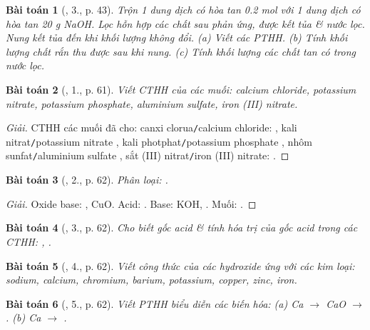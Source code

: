 \documentclass{article}
\newtheorem{baitoan}{Bài toán}
\begin{document}
\begin{baitoan}[\cite{SGK_Hoa_Hoc_9}, 3., p. 43]
	Trộn 1 dung dịch có hòa tan \emph{0.2 mol } với 1 dung dịch có hòa tan \emph{20 g NaOH}. Lọc hỗn hợp các chất sau phản ứng, được kết tủa \& nước lọc. Nung kết tủa đến khi khối lượng không đổi. (a) Viết các PTHH. (b) Tính khối lượng chất rắn thu được sau khi nung. (c) Tính khối lượng các chất tan có trong nước lọc.
\end{baitoan}

\begin{baitoan}[\cite{An_Hoa_Hoc_nang_cao_8_9}, 1., p. 61]
	Viết {\rm CTHH} của các muối: calcium chloride, potassium nitrate, potassium phosphate, aluminium sulfate, iron ({\rm III}) nitrate.
\end{baitoan}

\begin{proof}[Giải]
	CTHH các muối đã cho: canxi clorua{\tt/}calcium chloride: , kali nitrat{\tt/}potassium nitrate , kali photphat{\tt/}potassium phosphate , nhôm sunfat{\tt/}aluminium sulfate , sắt (III) nitrat{\tt/}iron (III) nitrate: .
\end{proof}

\begin{baitoan}[\cite{An_Hoa_Hoc_nang_cao_8_9}, 2., p. 62]
	Phân loại: {\rm{}}.
\end{baitoan}

\begin{proof}[Giải]
	Oxide base: , CuO. Acid: . Base: KOH, . Muối: .
\end{proof}

\begin{baitoan}[\cite{An_Hoa_Hoc_nang_cao_8_9}, 3., p. 62]
	Cho biết gốc acid \& tính hóa trị của gốc acid trong các {\rm CTHH}: {\rm{}, }.
\end{baitoan}

\begin{baitoan}[\cite{An_Hoa_Hoc_nang_cao_8_9}, 4., p. 62]
	Viết công thức của các hydroxide ứng với các kim loại: sodium, calcium, chromium, barium, potassium, copper, zinc, iron.
\end{baitoan}

\begin{baitoan}[\cite{An_Hoa_Hoc_nang_cao_8_9}, 5., p. 62]
	Viết {\rm PTHH} biểu diễn các biến hóa: (a) {\rm Ca $\to$ CaO $\to$ }. (b) {\rm Ca $\to$ }.
\end{baitoan}
\end{document}
